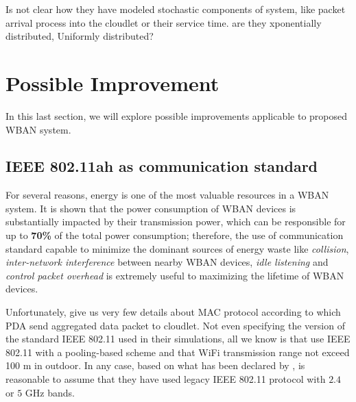 \documentclass[sigchi]{acmart}
\begin{document}
Is not clear how they have modeled stochastic components of system, like packet arrival process into the cloudlet or their service time.
are they xponentially distributed, Uniformly distributed?





























\section{Possible Improvement}

In this last section, we will explore possible improvements applicable to \citep{MSAReport} proposed WBAN system.

\subsection{IEEE 802.11ah as communication standard}

For several reasons, energy is one of the most valuable resources in a WBAN system. It is shown that the power consumption of WBAN devices is substantially impacted by their transmission power, which can be responsible for up to \textbf{70\%} of the total power consumption; therefore, the use of communication standard capable to minimize the dominant sources of energy waste like \textit{collision}, \textit{inter-network interference} between nearby WBAN devices, \textit{idle listening} and \textit{control packet overhead} is extremely useful to maximizing the lifetime of WBAN devices.

Unfortunately, \citet{MSAReport} give us very few details about MAC protocol according to which PDA send aggregated data packet to cloudlet. Not even specifying the version of the standard IEEE 802.11 used in their simulations, all we know is that \citep{MSAReport} use IEEE 802.11 with a pooling-based scheme and that WiFi transmission range not exceed 100 m in outdoor. In any case, based on what has been declared by \citep{MSAReport}, is reasonable to assume that they have used legacy IEEE 802.11 protocol with $2.4$ or $5$ GHz bands.
\end{document}
